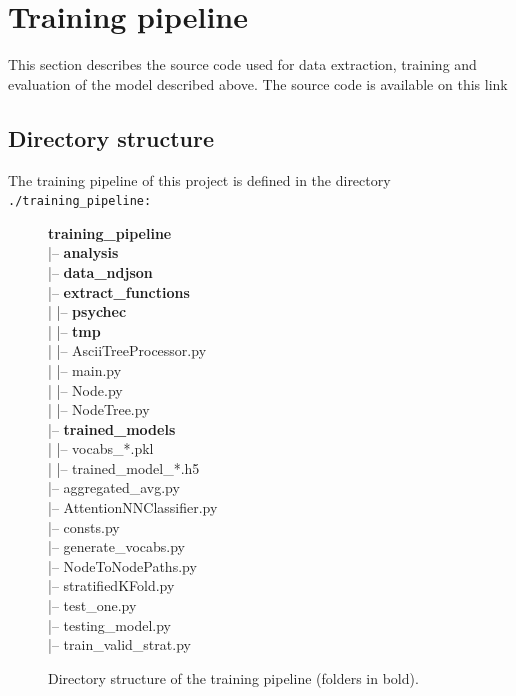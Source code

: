 \documentclass[10pt,english,a4paper]{report}
\begin{document}
\section{Training pipeline}
This section describes the source code used for data extraction, training and evaluation of the model described 
above. The source code is available on this link \cite{src}

\subsection{Directory structure}
The training pipeline of this project is defined in the directory \texttt{./training\_pipeline:}

\begin{figure}[H]
    \centering
    \begin{minipage}{\textwidth}
    \ttfamily %
    \textbf{training\_pipeline} \\
    |-- \textbf{analysis} \\
    |-- \textbf{data\_ndjson} \\
    |-- \textbf{extract\_functions} \\
    |   |-- \textbf{psychec} \\
    |   |-- \textbf{tmp} \\
    |   |-- AsciiTreeProcessor.py \\
    |   |-- main.py \\
    |   |-- Node.py \\
    |   |-- NodeTree.py \\
    |-- \textbf{trained\_models} \\
    |   |-- vocabs\_*.pkl \\
    |   |-- trained\_model\_*.h5 \\
    |-- aggregated\_avg.py \\
    |-- AttentionNNClassifier.py \\
    |-- consts.py \\
    |-- generate\_vocabs.py \\
    |-- NodeToNodePaths.py \\
    |-- stratifiedKFold.py \\
    |-- test\_one.py \\
    |-- testing\_model.py \\
    |-- train\_valid\_strat.py \\
    \end{minipage}
    \caption{Directory structure of the training pipeline (folders in bold).}
    \label{fig:training_pipeline_structure}
\end{figure}
\end{document}
